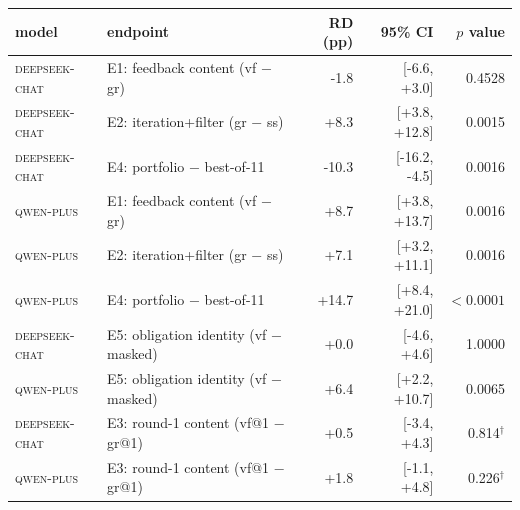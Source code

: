 \begin{tabular}{llrrr}
\toprule
model & endpoint & RD (pp) & 95\% CI & $p$ value \\
\midrule
\textsc{deepseek-chat} & E1: feedback content (vf $-$ gr) & -1.8 & [-6.6, +3.0] & 0.4528 \\
\textsc{deepseek-chat} & E2: iteration+filter (gr $-$ ss) & +8.3 & [+3.8, +12.8] & 0.0015 \\
\textsc{deepseek-chat} & E4: portfolio $-$ best-of-11 & -10.3 & [-16.2, -4.5] & 0.0016 \\
\textsc{qwen-plus} & E1: feedback content (vf $-$ gr) & +8.7 & [+3.8, +13.7] & 0.0016 \\
\textsc{qwen-plus} & E2: iteration+filter (gr $-$ ss) & +7.1 & [+3.2, +11.1] & 0.0016 \\
\textsc{qwen-plus} & E4: portfolio $-$ best-of-11 & +14.7 & [+8.4, +21.0] & $<0.0001$ \\
\midrule
\textsc{deepseek-chat} & E5: obligation identity (vf $-$ masked) & +0.0 & [-4.6, +4.6] & 1.0000 \\
\textsc{qwen-plus} & E5: obligation identity (vf $-$ masked) & +6.4 & [+2.2, +10.7] & 0.0065 \\
\textsc{deepseek-chat} & E3: round-1 content (vf@1 $-$ gr@1) & +0.5 & [-3.4, +4.3] & 0.814$^\dagger$ \\
\textsc{qwen-plus} & E3: round-1 content (vf@1 $-$ gr@1) & +1.8 & [-1.1, +4.8] & 0.226$^\dagger$ \\
\bottomrule
\end{tabular}
